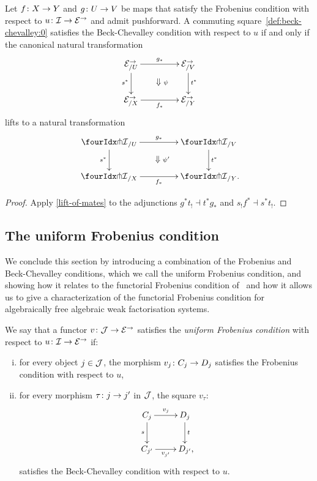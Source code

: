 \documentclass[reqno,10pt,a4paper,oneside,draft]{amsart}
\begin{document}
\begin{proposition} \label{lift-pushforward-BC}
Let $f \co X \to Y$ and $g \co U \to V$ be maps that satisfy the Frobenius condition with respect to $u \co \cal{I} \to \cal{E}^\to$ and admit pushforward.
A commuting square~\eqref{def:beck-chevalley:0} satisfies the Beck-Chevalley condition with respect to $u$ if and only if the canonical natural transformation
\[
\xymatrix@C+2em{
  \catE^\to_{/U}
  \ar[r]^{g_*}
  \ar[d]_{s^*}
  \ar@{}[dr]|{\textstyle\Downarrow \rlap{$\labelstyle\psi$}}
&
  \catE^\to_{/V}
  \ar[d]^{t^*}
\\
  \catE^\to_{/X}
  \ar[r]_{f_*}
&
  \catE^\to_{/Y}
}
\]
lifts to a natural transformation
\[
\xymatrix@C+2em{
  {\liftr{\cal{I}}}_{/U}
  \ar[r]^{g_*}
  \ar[d]_{s^*}
  \ar@{}[dr]|{\textstyle\Downarrow \rlap{$\labelstyle\psi'$}}
&
  {\liftr{\cal{I}}}_{/V}
  \ar[d]^{t^*}
\\
  {\liftr{\cal{I}}}_{/X}
  \ar[r]_{f_*}
&
  {\liftr{\cal{I}}}_{/Y}
\rlap{.}}
\]
\end{proposition}

\begin{proof}
Apply \cref{lift-of-mates} to the adjunctions $g^* t_! \dashv t^* g_*$ and $s_! f^* \dashv s^* t_!$.
\end{proof}


\subsection*{The uniform Frobenius condition} 
We conclude this section by introducing a combination of the Frobenius and Beck-Chevalley conditions,
which we call the uniform Frobenius condition, and showing how it relates to the functorial Frobenius
condition of~\cite{garner:topological-simplicial} and how it allows us to give a characterization of the functorial Frobenius condition for algebraically free algebraic weak factorisation systems.



\begin{definition} \label{def:uniFrobcond}
We say that a functor $v \co \cal{J} \to \catE^\to$ satisfies the \emph{uniform Frobenius condition} with respect to $u \co \cal{I} \to \cal{E}^\to$ if:
\begin{enumerate}[(i)]
\item for every object $j \in \cal{J}$, the morphism $v_j \co C_j \to D_j$ satisfies the Frobenius condition with respect to $u$,
\item for every morphism $\tau \co j \to j'$ in $\cal{J}$, the square $v_\tau$:
\[
\xymatrix{
  C_j
  \ar[r]^{v_j}
  \ar[d]_{s}
&
  D_j
  \ar[d]^{t}
\\
  C_{j'}
  \ar[r]_-{v_{j'}}
&
  D_{j'}
\rlap{,}}
\]
satisfies the Beck-Chevalley condition with respect to $u$.
\end{enumerate} 
\end{definition}
\end{document}
